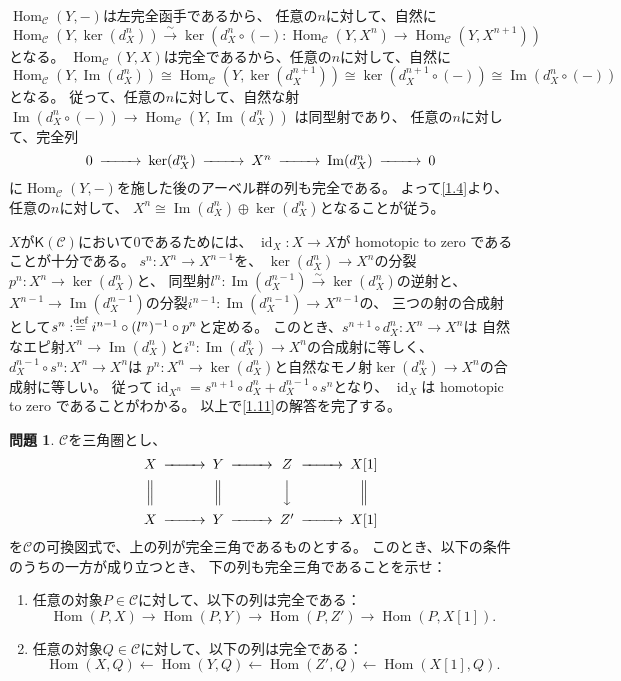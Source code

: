 \documentclass[uplatex,dvipdfmx]{jsarticle}
\makeatletter
\theoremstyle{definition}
\newtheorem{prob}[prob]{問題}
\renewenvironment{proof}[1][\proofname]{
  \pushQED{\qed}%
  \normalfont \topsep6\p@\@plus6\p@\relax
  \trivlist
  \item[\hskip\labelsep
    #1\@addpunct{\textbf{.}}]\ignorespaces
}{%
  \popQED\endtrivlist\@endpefalse
}
\providecommand{\proofname}{証明}
\DeclareMathOperator{\Hom}{\mathrm{Hom}}
\DeclareMathOperator{\id}{\mathrm{id}}
\DeclareMathOperator{\im}{\mathrm{Im}}
\newcommand{\sfK}{\mathsf{K}}
\newcommand\mcC{\mathcal{C}}
\def\dfn{:\overset{\mbox{{\scriptsize def}}}{=}}
\makeatother
\begin{document}
\begin{proof}
  \(\Hom_{\mcC}(Y,-)\)は左完全函手であるから、
  任意の\(n\)に対して、自然に
  \[
  \Hom_{\mcC}(Y,\ker(d_X^n)) \xrightarrow{\sim}
  \ker(d_X^n\circ (-): \Hom_{\mcC}(Y,X^n)\to \Hom_{\mcC}(Y,X^{n+1}))
  \]
  となる。
  \(\Hom_{\mcC}(Y,X)\)は完全であるから、任意の\(n\)に対して、自然に
  \[
  \Hom_{\mcC}(Y,\im(d_X^n))
  \cong \Hom_{\mcC}(Y,\ker(d_X^{n+1}))
  \cong \ker(d_X^{n+1}\circ (-))
  \cong \im(d_X^n\circ (-))
  \]
  となる。
  従って、任意の\(n\)に対して、自然な射
  \(\im(d_X^n\circ (-))\to \Hom_{\mcC}(Y,\im(d_X^n))\)
  は同型射であり、
  任意の\(n\)に対して、完全列
  \[
  \begin{CD}
    0 @>>> \ker(d_X^n) @>>> X^n @>>> \im(d_X^n) @>>> 0
  \end{CD}
  \]
  に\(\Hom_{\mcC}(Y,-)\)を施した後のアーベル群の列も完全である。
  よって\autoref{1.4}より、任意の\(n\)に対して、
  \(X^n \cong \im(d_X^n)\oplus \ker(d_X^n)\)となることが従う。

  \(X\)が\(\sfK(\mcC)\)において\(0\)であるためには、
  \(\id_X:X\to X\)が homotopic to zero であることが十分である。
  \(s^n:X^n\to X^{n-1}\)を、
  \(\ker(d_X^n)\to X^n\)の分裂\(p^n:X^n\to \ker(d_X^n)\)と、
  同型射\(l^n:\im(d_X^{n-1})\xrightarrow{\sim}\ker(d_X^n)\)の逆射と、
  \(X^{n-1}\to \im(d_X^{n-1})\)の分裂\(i^{n-1}:\im(d_X^{n-1})\to X^{n-1}\)の、
  三つの射の合成射として\(s^n \dfn i^{n-1}\circ (l^n)^{-1}\circ p^n\)と定める。
  このとき、\(s^{n+1}\circ d_X^n:X^n\to X^n\)は
  自然なエピ射\(X^n\to \im(d_X^n)\)と\(i^n:\im(d_X^n)\to X^n\)の合成射に等しく、
  \(d_X^{n-1}\circ s^n:X^n\to X^n\)は
  \(p^n:X^n\to \ker(d_X^n)\)と自然なモノ射\(\ker(d_X^n)\to X^n\)の合成射に等しい。
  従って\(\id_{X^n} = s^{n+1}\circ d_X^n + d_X^{n-1}\circ s^n\)となり、
  \(\id_X\)は homotopic to zero であることがわかる。
  以上で\autoref{1.11}の解答を完了する。
\end{proof}






\begin{prob}\label{1.12}
  \(\mcC\)を三角圏とし、
  \[
  \begin{CD}
    X @>>> Y @>>> Z @>>> X[1] \\
    @| @| @VVV @| \\
    X @>>> Y @>>> Z' @>>> X[1]
  \end{CD}
  \]
  を\(\mcC\)の可換図式で、上の列が完全三角であるものとする。
  このとき、以下の条件のうちの一方が成り立つとき、
  下の列も完全三角であることを示せ：
  \begin{enumerate}
    \item \label{1.12.1}
    任意の対象\(P\in \mcC\)に対して、以下の列は完全である：
    \[
    \Hom(P,X) \to \Hom(P,Y) \to \Hom(P,Z') \to \Hom(P,X[1]).
    \]
    \item \label{1.12.2}
    任意の対象\(Q\in \mcC\)に対して、以下の列は完全である：
    \[
    \Hom(X,Q) \gets \Hom(Y,Q) \gets \Hom(Z',Q) \gets \Hom(X[1],Q).
    \]
  \end{enumerate}
\end{prob}
\end{document}
